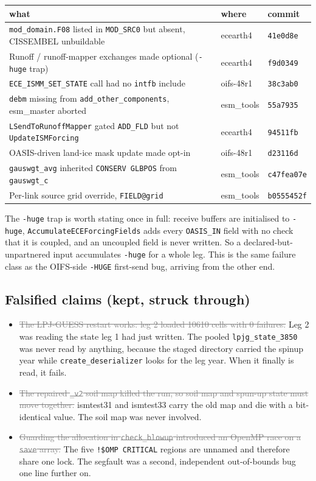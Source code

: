 \documentclass[11pt,a4paper]{article}
\newcommand{\code}[1]{\texttt{\small #1}}
\newcommand{\dead}[1]{\textcolor{gray}{\sout{#1}}}
\begin{document}
\begin{center}
\begin{tabular}{@{}lll@{}}
\toprule
what & where & commit \\
\midrule
\code{mod\_domain.F08} listed in \code{MOD\_SRC0} but absent, CISSEMBEL unbuildable & ecearth4 & \code{41e0d8e} \\
Runoff / runoff-mapper exchanges made optional (\code{-huge} trap) & ecearth4 & \code{f9d0349} \\
\code{ECE\_ISMM\_SET\_STATE} call had no \code{intfb} include & oifs-48r1 & \code{38c3ab0} \\
\code{debm} missing from \code{add\_other\_components}, esm\_master aborted & esm\_tools & \code{55a7935} \\
\code{LSendToRunoffMapper} gated \code{ADD\_FLD} but not \code{UpdateISMForcing} & ecearth4 & \code{94511fb} \\
OASIS-driven land-ice mask update made opt-in & oifs-48r1 & \code{d23116d} \\
\code{gauswgt\_avg} inherited \code{CONSERV GLBPOS} from \code{gauswgt\_c} & esm\_tools & \code{c47fea07e} \\
Per-link source grid override, \code{FIELD@grid} & esm\_tools & \code{b0555452f} \\
\bottomrule
\end{tabular}
\end{center}

\noindent
The \code{-huge} trap is worth stating once in full: receive buffers are initialised to
\code{-huge}, \code{AccumulateECEForcingFields} adds every \code{OASIS\_IN} field with no check
that it is coupled, and an uncoupled field is never written. So a declared-but-unpartnered input
accumulates \code{-huge} for a whole leg. This is the same failure class as the OIFS-side
\code{-HUGE} first-send bug, arriving from the other end.

\subsection{Falsified claims (kept, struck through)}

\begin{itemize}
\item \dead{The LPJ-GUESS restart works: leg 2 loaded 10610 cells with 0 failures.} Leg 2 was
reading the state leg 1 had just written. The pooled \code{lpjg\_state\_3850} was never read by
anything, because the staged directory carried the spinup year while \code{create\_deserializer}
looks for the leg year. When it finally is read, it fails.
\item \dead{The repaired \code{\_v2} soil map killed the run, so soil map and spun-up state must
move together.} ismtest31 and ismtest33 carry the old map and die with a bit-identical value.
The soil map was never involved.
\item \dead{Guarding the allocation in \code{check\_blowup} introduced an OpenMP race on a
\code{save} array.} The five \code{!\$OMP CRITICAL} regions are unnamed and therefore share one
lock. The segfault was a second, independent out-of-bounds bug one line further on.
\end{itemize}
\end{document}
